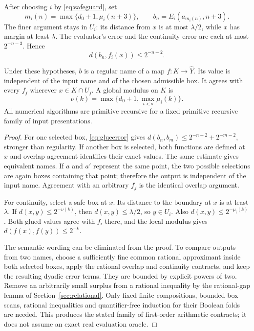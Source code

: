 After choosing $i$ by \eqref{eq:safeguard}, set
\[
 m_i(n)=\max\{d_0+1,\mu_i(n+3)\},\qquad
 b_n=E_i(a_{m_i(n)},n+3).
\]
The finer argument stays in $U_i$: its distance from $x$ is at most
$\lambda/2$, while $x$ has margin at least $\lambda$. The evaluator's error
and the continuity error are each at most $2^{-n-3}$. Hence
\begin{equation}\label{eq:glueerror}
             d(b_n,f_i(x))\le2^{-n-2}.
\end{equation}

\begin{theorem}\label{thm:gluing}
Under these hypotheses, $b$ is a regular name of a map $f:K\to\widehat Y$.
Its value is independent of the input name and of the chosen admissible box.
It agrees with every $f_j$ wherever $x\in K\cap U_j$. A global modulus on
$K$ is
\[
        \nu(k)=\max\{d_0+1,\max_{i<s}\mu_i(k)\}.
\]
All numerical algorithms are primitive recursive for a fixed primitive
recursive family of input presentations.
\end{theorem}

\begin{proof}
For one selected box, \eqref{eq:glueerror} gives
$d(b_n,b_m)\le2^{-n-2}+2^{-m-2}$, stronger than regularity. If another
box is selected, both functions are defined at $x$ and overlap agreement
identifies their exact values. The same estimate gives equivalent names.
If $a$ and $a'$ represent the same point, the two possible selections are
again boxes containing that point; therefore the output is independent of
the input name. Agreement with an arbitrary $f_j$ is the identical overlap
argument.

For continuity, select a safe box at $x$. Its distance to the boundary at
$x$ is at least $\lambda$. If $d(x,y)\le2^{-\nu(k)}$, then
$d(x,y)\le\lambda/2$, so $y\in U_i$. Also
$d(x,y)\le2^{-\mu_i(k)}$. Both glued values agree with $f_i$ there,
and the local modulus gives $d(f(x),f(y))\le2^{-k}$.

The semantic wording can be eliminated from the proof. To compare outputs
from two names, choose a sufficiently fine common rational approximant
inside both selected boxes, apply the rational overlap and continuity
contracts, and keep the resulting dyadic error terms. They are bounded by
explicit powers of two. Remove an arbitrarily small surplus from a rational
inequality by the rational-gap lemma of Section~\ref{sec:relational}.
Only fixed finite compositions, bounded box scans, rational inequalities and
quantifier-free induction for their Boolean folds are needed. This produces
the stated family of first-order arithmetic contracts; it does not assume
an exact real evaluation oracle.
\end{proof}

